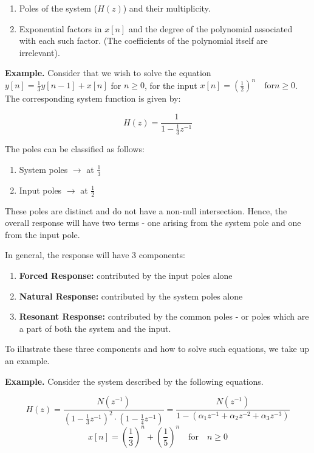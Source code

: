 \documentclass{article}
\theoremstyle{definition}
\begin{document}
\begin{enumerate}
    \item Poles of the system ($H(z)$) and their multiplicity. 
    \item Exponential factors in $x[n]$ and the degree of the polynomial associated with each such factor. (The coefficients of the polynomial itself are irrelevant).
\end{enumerate} \medskip

\textbf{Example.} Consider that we wish to solve the equation $y[n] = \frac{1}{3} y[n-1] + x[n]$ for $n \geq 0$, for the input $x[n] = (\frac{1}{2})^n \quad \text{for} n \geq 0$. The corresponding system function is given by: 

\[
    H(z) = \frac{1}{1 - \frac{1}{3}z^{-1}} 
\]

The poles can be classified as follows:

\begin{enumerate}
    \item System poles $\rightarrow$ at $\frac{1}{3}$
    \item Input poles $\rightarrow$ at $\frac{1}{2}$
\end{enumerate}

These poles are distinct and do not have a non-null intersection. Hence, the overall response will have two terms - one arising from the system pole and one from the input pole. 

In general, the response will have 3 components:

\begin{enumerate}
    \item \textbf{Forced Response:} contributed by the input poles alone
    \item \textbf{Natural Response:} contributed by the system poles alone
    \item \textbf{Resonant Response:} contributed by the common poles - or poles which are a part of both the system and the input. 
\end{enumerate}

To illustrate these three components and how to solve such equations, we take up an example. 

\textbf{Example.} Consider the system described by the following equations.

\[
    H(z) = \frac{N(z^{-1})}{(1 - \frac{1}{3}z^{-1})^2 \cdot (1 - \frac{1}{4}z^{-1})}  = \frac{N(z^{-1})}{1 - (\alpha_1z^{-1} + \alpha_2z^{-2} + \alpha_3z^{-3})}
\]
\[
    x[n] = \left(\frac{1}{3}\right)^n + \left(\frac{1}{5}\right)^n \quad \text{for} \quad n \geq 0
\]
\end{document}
